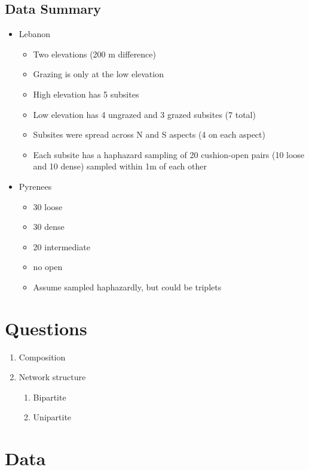 \documentclass[12pt]{article}
\begin{document}
\subsection{Data Summary}
\begin{itemize}
\item Lebanon 
  \begin{itemize}
  \item Two elevations (200 m difference)
  \item Grazing is only at the low elevation
  \item High elevation has 5 subsites
  \item Low elevation has 4 ungrazed and 3 grazed subsites (7 total)
  \item Subsites were spread across N and S aspects (4 on each aspect)
  \item Each subsite has a haphazard sampling of 20 cushion-open pairs
    (10 loose and 10 dense) sampled within 1m of each other
  \end{itemize}
\item Pyrenees
  \begin{itemize}
  \item 30 loose
  \item 30 dense
  \item 20 intermediate
  \item no open
  \item Assume sampled haphazardly, but could be triplets
  \end{itemize}
\end{itemize}

\section{Questions}

\begin{enumerate}
  \begin{enumerate}
  \item Composition
  \item Network structure
    \begin{enumerate}
    \item Bipartite
    \item Unipartite
    \end{enumerate}
  \end{enumerate}
\end{enumerate}

\section{Data}
\end{document}
